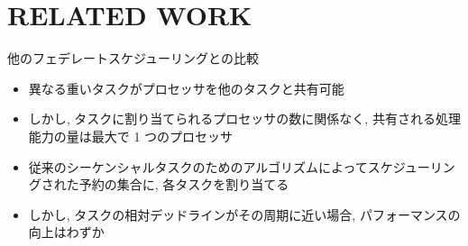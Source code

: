 
\section{RELATED WORK}
\label{sec: related work}

\begin{frame}{他のフェデレートスケジューリングとの比較}
    \begin{block}{\cite{jiang2017semi}}
        \setlength{\linewidth}{0.98\columnwidth}
        \begin{itemize}
            \item 異なる重いタスクがプロセッサを他のタスクと共有可能
            \item しかし, タスクに割り当てられるプロセッサの数に関係なく, 共有される処理能力の量は最大で 1 つのプロセッサ
        \end{itemize}
    \end{block}
    \begin{block}{\cite{ueter2018reservation}}
        \setlength{\linewidth}{0.98\columnwidth}
        \begin{itemize}
            \item 従来のシーケンシャルタスクのためのアルゴリズムによってスケジューリングされた予約の集合に, 各タスクを割り当てる
            \item しかし, タスクの相対デッドラインがその周期に近い場合, パフォーマンスの向上はわずか
        \end{itemize}
    \end{block}
\end{frame}

